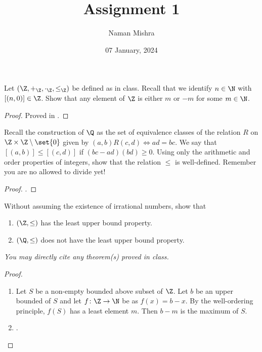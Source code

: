 \documentclass[12pt]{article}
\title{Assignment 1}
\author{Naman Mishra}
\date{07 January, 2024}
\begin{document}
\maketitle
\setcounter{assignment}{1}

\begin{problem}
    Let $(\Z, +_\Z, \cdot_\Z, \le_\Z)$ be defined as in class.
    Recall that we identify $n \in \N$ with $[(n, 0)] \in \Z$.
    Show that any element of $\Z$ is either $m$ or $-m$ for some $m \in \N$.
\end{problem}
\begin{proof}
    Proved in .
\end{proof}

\begin{problem}
    Recall the construction of $\Q$ as the set of equivalence classes of the
    relation $R$ on $\Z \times \Z \setminus \set{0}$ given by
    $(a, b) R (c, d) \iff ad = bc$.
    We say that $[(a, b)] \le [(c, d)]$ if $(bc - ad)(bd) \ge 0$.
    Using only the arithmetic and order properties of integers, show that the
    relation $\le$ is well-defined.
    Remember you are no allowed to divide yet!
\end{problem}
\begin{proof}
    .
\end{proof}

\begin{problem} \label{prb:ZQ:lub}
    Without assuming the existence of irrational numbers, show that
    \begin{enumerate}[label=(\alph*)]
        \item $(\Z, \le)$ has the least upper bound property.
        \item $(\Q, \le)$ does not have the least upper bound property.
    \end{enumerate}
    \textit{You may directly cite any theorem(s) proved in class.}
\end{problem}
\begin{proof} \leavevmode
    \begin{enumerate}[label=(\alph*)]
        \item Let $S$ be a non-empty bounded above subset of $\Z$.
        Let $b$ be an upper bounded of $S$ and let $f \colon \Z \to \N$ be as
        $f(x) = b - x$.
        By the well-ordering principle, $f(S)$ has a least element $m$.
        Then $b - m$ is the maximum of $S$.
        \item {}. \qedhere
    \end{enumerate}
\end{proof}
\end{document}
